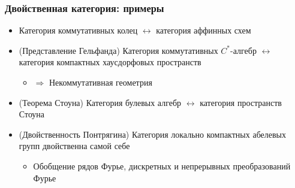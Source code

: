 \documentclass{beamer}
\begin{document}
\begin{frame}
\frametitle{Двойственная категория: примеры}
\begin{itemize}
\item Категория коммутативных колец \begin{math}\leftrightarrow\end{math} категория аффинных схем
\pause
\item (Представление Гельфанда) Категория коммутативных \begin{math}C^*\end{math}-алгебр \begin{math}\leftrightarrow\end{math} категория компактных хаусдорфовых пространств
\pause
\begin{itemize}
\item \begin{math}\Rightarrow\end{math} Некоммутативная геометрия
\end{itemize}
\pause
\item (Теорема Стоуна) Категория булевых алгебр \begin{math}\leftrightarrow\end{math} категория пространств Стоуна
\pause
\item (Двойственность Понтрягина) Категория локально компактных абелевых групп двойственна самой себе
\pause
\begin{itemize}
\item Обобщение рядов Фурье, дискретных и непрерывных преобразований Фурье
\end{itemize}
\end{itemize}
\end{frame}
\end{document}
